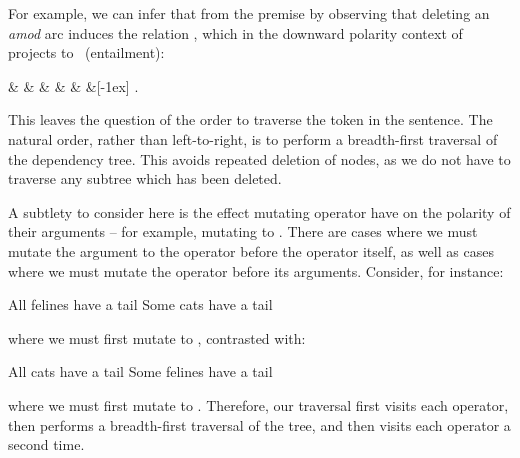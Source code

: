 For example, we can infer that 
   from the premise
   by observing that deleting
  an \textit{amod} arc induces the relation \reverse, which in the downward
  polarity context of \textit{} projects to \forward\ (entailment):

\begin{center}
\begin{dependency}[text only label, label style={above}]
  \begin{deptext}[column sep=-0.00cm]
     \&  \&  \& 
       \&  \&  \&[-1ex] .\\
  \end{deptext}
\end{dependency}
\end{center}

This leaves the question of the order to traverse the token in the sentence.
The natural order, rather than left-to-right, is to perform a breadth-first
  traversal of the dependency tree.
This avoids repeated deletion of nodes, as we do not have to traverse any
  subtree which has been deleted.

A subtlety to consider here is the effect mutating operator have on the
  polarity of their arguments -- for example, mutating  to
  .
There are cases where we must mutate the argument to the operator before
  the operator itself, as well as cases where we must mutate the operator
  before its arguments.
Consider, for instance:

\entailmentExample
{All felines have a tail}
{Some cats have a tail}

\noindent where we must first mutate  to , contrasted with:

\entailmentExample
{All cats have a tail}
{Some felines have a tail}

\noindent where we must first mutate  to .
Therefore, our traversal first visits each operator, then performs a breadth-first
  traversal of the tree, and then visits each operator a second time.

